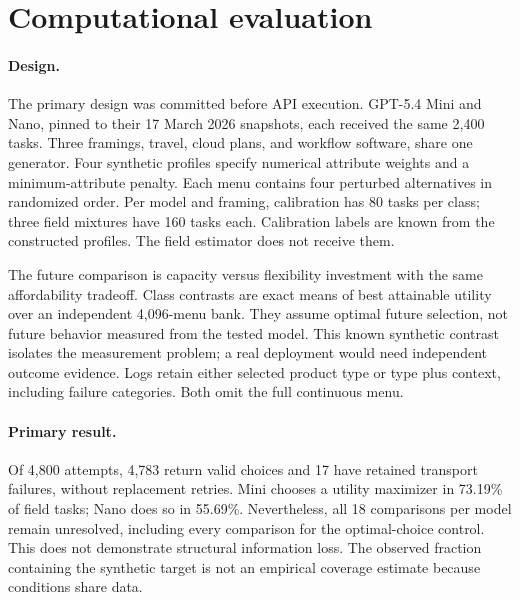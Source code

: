 \documentclass[manuscript,review,anonymous]{acmart}
\begin{document}
\section{Computational evaluation}
\paragraph{Design.}
The primary design was committed before API execution. GPT-5.4 Mini and Nano, pinned to their 17 March 2026 snapshots, each received the same 2,400 tasks. Three framings, travel, cloud plans, and workflow software, share one generator. Four synthetic profiles specify numerical attribute weights and a minimum-attribute penalty. Each menu contains four perturbed alternatives in randomized order. Per model and framing, calibration has 80 tasks per class; three field mixtures have 160 tasks each. Calibration labels are known from the constructed profiles. The field estimator does not receive them.

The future comparison is capacity versus flexibility investment with the same affordability tradeoff. Class contrasts are exact means of best attainable utility over an independent 4,096-menu bank. They assume optimal future selection, not future behavior measured from the tested model. This known synthetic contrast isolates the measurement problem; a real deployment would need independent outcome evidence. Logs retain either selected product type or type plus context, including failure categories. Both omit the full continuous menu.

\paragraph{Primary result.}
Of 4,800 attempts, 4,783 return valid choices and 17 have retained transport failures, without replacement retries. Mini chooses a utility maximizer in 73.19\% of field tasks; Nano does so in 55.69\%. Nevertheless, all 18 comparisons per model remain unresolved, including every comparison for the optimal-choice control. This does not demonstrate structural information loss. The observed fraction containing the synthetic target is not an empirical coverage estimate because conditions share data.
\end{document}
